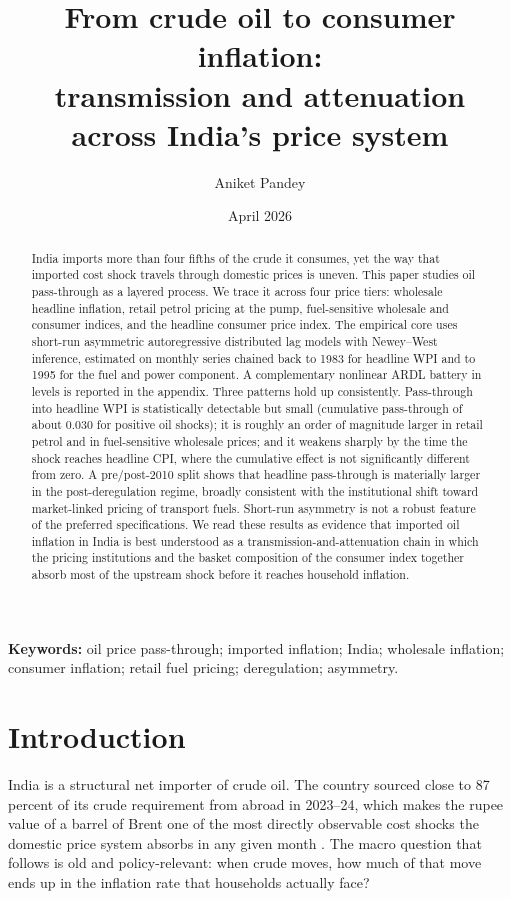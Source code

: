 \documentclass[11pt,a4paper]{article}
\title{\bfseries From crude oil to consumer inflation:\\ transmission and attenuation across India's price system}
\author{Aniket Pandey}
\date{April 2026}
\begin{document}
\maketitle

\begin{abstract}
\noindent India imports more than four fifths of the crude it consumes, yet the way that imported cost shock travels through domestic prices is uneven. This paper studies oil pass-through as a layered process. We trace it across four price tiers: wholesale headline inflation, retail petrol pricing at the pump, fuel-sensitive wholesale and consumer indices, and the headline consumer price index. The empirical core uses short-run asymmetric autoregressive distributed lag models with Newey--West inference, estimated on monthly series chained back to 1983 for headline WPI and to 1995 for the fuel and power component. A complementary nonlinear ARDL battery in levels is reported in the appendix. Three patterns hold up consistently. Pass-through into headline WPI is statistically detectable but small (cumulative pass-through of about 0.030 for positive oil shocks); it is roughly an order of magnitude larger in retail petrol and in fuel-sensitive wholesale prices; and it weakens sharply by the time the shock reaches headline CPI, where the cumulative effect is not significantly different from zero. A pre/post-2010 split shows that headline pass-through is materially larger in the post-deregulation regime, broadly consistent with the institutional shift toward market-linked pricing of transport fuels. Short-run asymmetry is not a robust feature of the preferred specifications. We read these results as evidence that imported oil inflation in India is best understood as a transmission-and-attenuation chain in which the pricing institutions and the basket composition of the consumer index together absorb most of the upstream shock before it reaches household inflation.
\end{abstract}

\noindent\textbf{Keywords:} oil price pass-through; imported inflation; India; wholesale inflation; consumer inflation; retail fuel pricing; deregulation; asymmetry.

\bigskip

\section{Introduction}
\label{sec:intro}

India is a structural net importer of crude oil. The country sourced close to 87 percent of its crude requirement from abroad in 2023--24, which makes the rupee value of a barrel of Brent one of the most directly observable cost shocks the domestic price system absorbs in any given month \citep{ppac2024}. The macro question that follows is old and policy-relevant: when crude moves, how much of that move ends up in the inflation rate that households actually face?
\end{document}
